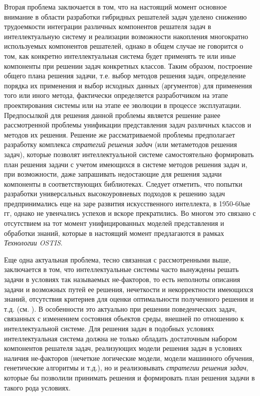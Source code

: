 Вторая проблема заключается в том, что на настоящий момент основное внимание в области разработки гибридных решателей задач уделено снижению трудоемкости интеграции различных компонентов решателя задач в интеллектуальную систему и реализации возможности накопления многократно используемых компонентов решателей, однако в общем случае не говорится о том, как конкретно интеллектуальная система будет применять те или иные компоненты при решении задач конкретных классов. Таким образом, построение общего плана решения задачи, т.е. выбор методов решения задач, определение порядка их применения и выбор исходных данных (аргументов) для применения того или иного метода, фактически определяется разработчиком на этапе проектирования системы или на этапе ее эволюции в процессе эксплуатации. Предпосылкой для решения данной проблемы является решение ранее рассмотренной проблемы унификации представления задач различных классов и методов их решения. Решение же рассматриваемой проблемы предполагает разработку комплекса \textit{стратегий решения задач} (или метаметодов решения задач), которые позволят интеллектуальной системе самостоятельно формировать план решения задачи с учетом имеющихся в системе методов решения задач и, при возможности, даже запрашивать недостающие для решения задачи компоненты в соответствующих библиотеках. Следует отметить, что попытки разработки универсальных высокоуровневых подходов к решению задач предпринимались еще на заре развития искусственного интеллекта, в 1950-60ые гг, однако не увенчались успехов и вскоре прекратились. Во многом это связано с отсутствием на тот момент унифицированных моделей представления и обработки знаний, которые в настоящий момент предлагаются в рамках \textit{Технологии OSTIS}. 

Еще одна актуальная проблема, тесно связанная с рассмотренными выше, заключается в том, что интеллектуальные системы часто вынуждены решать задачи в условиях так называемых не-факторов, то есть неполноты описания задачи и возможных путей ее решения, нечеткости и некорректности имеющихся знаний, отсутствия критериев для оценки оптимальности полученного решения и т.д. (см. ). В особенности это актуально при решении поведенческих задач, связанных с изменением состояния объектов среды, внешней по отношению к интеллектуальной системе. Для решения задач в подобных условиях интеллектуальная система должна не только обладать достаточным набором компонентов решателя задач, реализующих модели решения задач в условиях наличия не-факторов (нечеткие логические модели, модели машинного обучения, генетические алгоритмы и т.д.), но и реализовывать \textit{стратегии решения задач}, которые бы позволили принимать решения и формировать план решения задачи в такого рода условиях.

